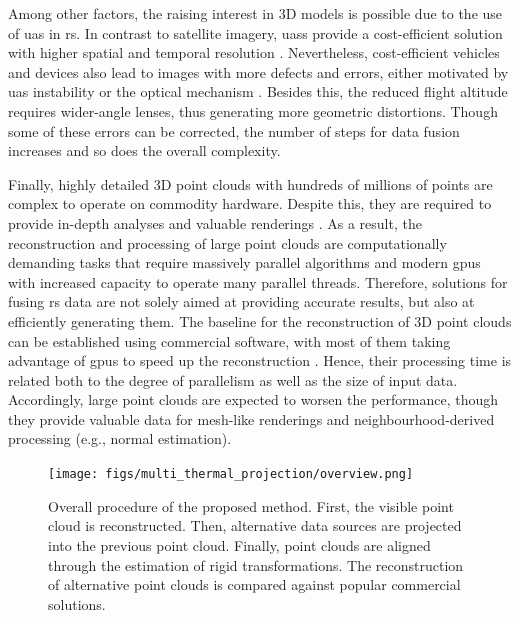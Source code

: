 Among other factors, the raising interest in 3D models is possible due to the use of \acrshort{uas} in \acrshort{rs}. In contrast to satellite imagery, \acrshort{uas}s provide a cost-efficient solution with higher spatial and temporal resolution \cite{singh_bibliometric_2022}. Nevertheless, cost-efficient vehicles and devices also lead to images with more defects and errors, either motivated by \acrshort{uas} instability \cite{akhoundi_khezrabad_new_2022} or the optical mechanism \cite{mohamad_screening_2021, lopez_framework_2021}. Besides this, the reduced flight altitude requires wider-angle lenses, thus generating more geometric distortions. Though some of these errors can be corrected, the number of steps for data fusion increases and so does the overall complexity. 

Finally, highly detailed 3D point clouds with hundreds of millions of points are complex to operate on commodity hardware. Despite this, they are required to provide in-depth analyses and valuable renderings \cite{schutz_rendering_2021}. As a result, the reconstruction and processing of large point clouds are computationally demanding tasks that require massively parallel algorithms and modern \acrshort{gpu}s with increased capacity to operate many parallel threads. Therefore, solutions for fusing \acrshort{rs} data are not solely aimed at providing accurate results, but also at efficiently generating them. The baseline for the reconstruction of 3D point clouds can be established using commercial software, with most of them taking advantage of \acrshort{gpu}s to speed up the reconstruction \cite{jiang_efficient_2020}. Hence, their processing time is related both to the degree of parallelism as well as the size of input data. Accordingly, large point clouds are expected to worsen the performance, though they provide valuable data for mesh-like renderings and neighbourhood-derived processing (e.g., normal estimation).   

\begin{figure}[ht]
    \centering
    \texttt{[image: figs/multi\_thermal\_projection/overview.png]}
    \caption{Overall procedure of the proposed method. First, the visible point cloud is reconstructed. Then, alternative data sources are projected into the previous point cloud. Finally, point clouds are aligned through the estimation of rigid transformations. The reconstruction of alternative point clouds is compared against popular commercial solutions. }
	\label{fig:multi_thermal_overview}
\end{figure}

